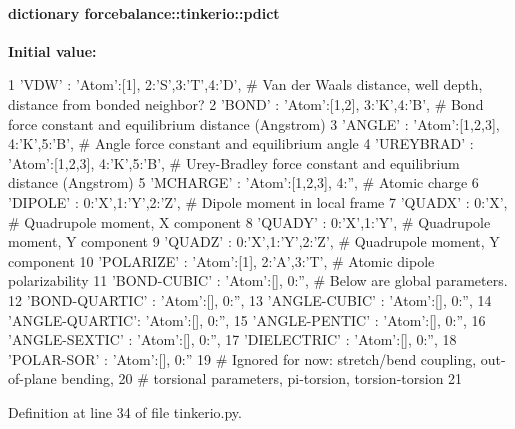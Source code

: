 \hypertarget{namespaceforcebalance_1_1tinkerio_a37b5a9c337cd2791f6d6c00bf295e69c}{
\paragraph[{pdict}]{\setlength{\rightskip}{0pt plus 5cm}dictionary {\bf forcebalance\-::tinkerio\-::pdict}}}\label{namespaceforcebalance_1_1tinkerio_a37b5a9c337cd2791f6d6c00bf295e69c}
{\bfseries \-Initial value\-:}
\begin{DoxyCode}
1 {'VDW'          : {'Atom':[1], 2:'S',3:'T',4:'D'}, # Van der Waals distance,
       well depth, distance from bonded neighbor?
2          'BOND'         : {'Atom':[1,2], 3:'K',4:'B'},     # Bond force
       constant and equilibrium distance (Angstrom)
3          'ANGLE'        : {'Atom':[1,2,3], 4:'K',5:'B'},   # Angle force
       constant and equilibrium angle
4          'UREYBRAD'     : {'Atom':[1,2,3], 4:'K',5:'B'},   # Urey-Bradley force
       constant and equilibrium distance (Angstrom)
5          'MCHARGE'       : {'Atom':[1,2,3], 4:''},          # Atomic charge
6          'DIPOLE'       : {0:'X',1:'Y',2:'Z'},             # Dipole moment in
       local frame
7          'QUADX'        : {0:'X'},                         # Quadrupole moment,
       X component
8          'QUADY'        : {0:'X',1:'Y'},                   # Quadrupole moment,
       Y component
9          'QUADZ'        : {0:'X',1:'Y',2:'Z'},             # Quadrupole moment,
       Y component
10          'POLARIZE'     : {'Atom':[1], 2:'A',3:'T'},       # Atomic dipole
       polarizability
11          'BOND-CUBIC'   : {'Atom':[], 0:''},    # Below are global parameters.
12          'BOND-QUARTIC' : {'Atom':[], 0:''},
13          'ANGLE-CUBIC'  : {'Atom':[], 0:''},
14          'ANGLE-QUARTIC': {'Atom':[], 0:''},
15          'ANGLE-PENTIC' : {'Atom':[], 0:''},
16          'ANGLE-SEXTIC' : {'Atom':[], 0:''},
17          'DIELECTRIC'   : {'Atom':[], 0:''},
18          'POLAR-SOR'    : {'Atom':[], 0:''}
19                                                 # Ignored for now: stretch/bend
       coupling, out-of-plane bending,
20                                                 # torsional parameters,
       pi-torsion, torsion-torsion
21          }
\end{DoxyCode}


\-Definition at line 34 of file tinkerio.\-py.

